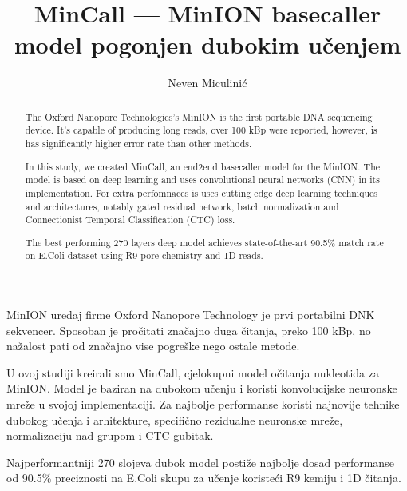 \documentclass[times, utf8, seminar, numeric]{fer}
\begin{document}
\theoremstyle{definition}
\newtheorem{definition}{Definition}[section]


\title{MinCall --- MinION basecaller model pogonjen dubokim učenjem}
\author{Neven Miculinić}

\maketitle
\tableofcontents

\begin{sazetak}
    MinION uredaj firme Oxford Nanopore Technology je prvi portabilni DNK sekvencer. Sposoban je pročitati značajno duga čitanja, preko 100 kBp, no nažalost pati od značajno vise pogreške nego ostale metode.

    U ovoj studiji kreirali smo MinCall, cjelokupni model očitanja nukleotida za MinION. Model je baziran na dubokom učenju i koristi konvolucijske neuronske mreže u svojoj implementaciji. Za najbolje performanse koristi najnovije tehnike dubokog učenja i arhitekture, specifično rezidualne neuronske mreže, normalizaciju nad grupom i CTC gubitak.

    Najperformantniji 270 slojeva dubok model postiže najbolje dosad performanse od 90.5\% preciznosti na E.Coli skupu za učenje koristeći R9 kemiju i 1D čitanja.
\end{sazetak}

\begin{abstract}
    The Oxford Nanopore Technologies's MinION is the first portable DNA sequencing device. It's capable of producing long reads, over 100 kBp were reported, however, is has significantly higher error rate than other methods.

    In this study, we created MinCall, an end2end basecaller model for the MinION. The model is based on deep learning and uses convolutional neural networks (CNN) in its implementation. For extra perfomnaces is uses cutting edge deep learning techniques and architectures, notably gated residual network, batch normalization and Connectionist Temporal Classification (CTC) loss.

    The best performing 270 layers deep model achieves state-of-the-art 90.5\% match rate on E.Coli dataset using R9 pore chemistry and 1D reads.
\end{abstract}
\end{document}
